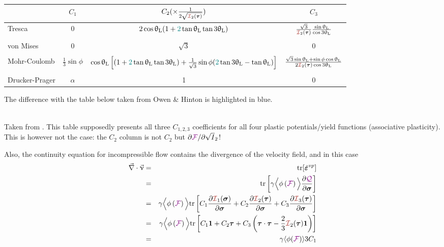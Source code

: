 \begin{center}
\begin{footnotesize}
\begin{tabular}{lccc}
\hline
& $C_1$ & $C_2(\times \frac{1}{2 \sqrt{{\III}_2({\bm \tau})}})$ & $C_3$ \\
              \hline\hline
Tresca         &0 & $2 \cos\uptheta_{\rm L} ( 1 + {\color{teal}2} \tan\uptheta_{\rm L}  \tan 3\uptheta_{\rm L})$ &
$\frac{\sqrt{3}}{{\III}_2({\bm \tau}) } \frac{\sin\uptheta_{\rm L} }{\cos 3\uptheta_{\rm L}}$
\\ \\
von Mises      &0& $\sqrt{3}$ & 0 \\ \\ 
Mohr-Coulomb   & $\frac13 \sin\phi$ & 
$
\cos \uptheta_{\rm L} \left[
(1 +  {\color{teal}2}\tan \uptheta_{\rm L}   \tan 3\uptheta_{\rm L})
+\frac{1}{\sqrt{3}} \sin\phi
( {\color{teal}2}\tan 3\uptheta_{\rm L} - \tan\uptheta_{\rm L}) \right]$
&
$\frac{\sqrt{3}\sin\uptheta_{\rm L} +  \sin \phi \cos \uptheta_{\rm L}}
{2 {\III}_2({\bm \tau}) \cos 3\uptheta_{\rm L}}$ 
\\ \\
Drucker-Prager & $\alpha$ & 1 & 0 \\  
\hline
\end{tabular}
\end{footnotesize}
\end{center}
The difference with the table below  taken from Owen \& Hinton \cite{owhi} is highlighted in blue.

\begin{center}
\\
{\captionfont Taken from \cite{owhi}.
This table supposedly presents all three $C_{1,2,3}$ coefficients 
for all four plastic potentials/yield functions (associative plasticity).
This is however not the case: the $C_2$ column is not $C_2$ but 
$\partial {\color{violet}\cal F}/\partial\sqrt I_2$!
}
\end{center}


Also, the continuity equation for incompressible flow contains the divergence 
of the velocity field, and in this case 
\begin{eqnarray}
\vec\nabla\cdot\vec\upnu 
&=& {\rm tr}[\dot{\bm\varepsilon}^{vp}]  \nn\\
&=& {\rm tr}\left[ 
\gamma \Big\langle
\phi\left( {\FFF} \right) 
\Big\rangle
\frac{\partial \QQQ}{\partial \bm\sigma}
\right] \nn\\
&=& 
\gamma \Big\langle
\phi\left( {\FFF} \right) 
\Big\rangle
{\rm tr}\left[
C_1  \frac{\partial {\III}_1(\bm\sigma)}{\partial \bm\sigma} 
+
C_2  \frac{\partial {\III}_2(\bm\tau)}{\partial \bm\sigma} 
+
C_3  \frac{\partial {\III}_3(\bm\tau)}{\partial \bm\sigma} 
\right] \nn\\
&=&
\gamma \Big\langle
\phi\left( {\FFF} \right) 
\Big\rangle
{\rm tr}\left[
C_1 {\bm 1} 
+
C_2 {\bm \tau} 
+
C_3  \left( \bm\tau\cdot\bm\tau - \frac23  {\III}_2(\bm\tau)  {\bm 1} \right)
\right] \nn\\
&=&  \gamma \langle \phi(\FFF) \rangle  3 C_1
\end{eqnarray}

